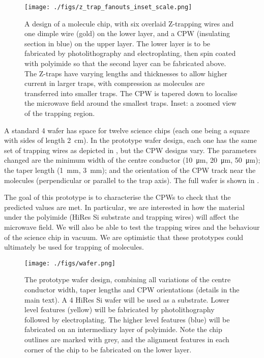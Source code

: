\begin{figure}[tph]
  \texttt{[image: ./figs/z\_trap\_fanouts\_inset\_scale.png]}
  \caption{
    A design of a molecule chip, with six overlaid Z-trapping wires and one
    dimple wire (gold) on the lower layer, and a CPW (insulating section in
    blue) on the upper layer.  The lower layer is to be fabricated by
    photolithography and electroplating, then spin coated with polyimide so that
    the second layer can be fabricated above. The Z-traps have varying lengths
    and thicknesses to allow higher current in larger traps, with compression as
    molecules are transferred into smaller traps. The CPW is tapered down to
    localise the microwave field around the smallest traps. Inset: a zoomed view
    of the trapping region.
  }
  \label{experiment:fig:chipdesign}
\end{figure}

A standard \SI{4}{\inch} wafer has space for twelve science chips (each one being
a square with sides of length \SI{2}{\centi\metre}). In the prototype wafer
design, each one has the same set of trapping wires as depicted in
, but the CPW designs vary. The parameters
changed are the minimum width of the centre conductor (\SI{10}{\micro\metre},
\SI{20}{\micro\metre}, \SI{50}{\micro\metre}); the taper length
(\SI{1}{\milli\metre}, \SI{3}{\milli\metre}); and the orientation of the CPW
track near the molecules (perpendicular or parallel to the trap axis). The full
wafer is shown in .

The goal of this prototype is to characterise the CPWs to check that the
predicted values are met. In particular, we are interested in how the material
under the polyimide (HiRes Si substrate and trapping wires) will affect the
microwave field. We will also be able to test the trapping wires and the
behaviour of the science chip in vacuum. We are optimistic that these prototypes could
ultimately be used for trapping of molecules.

\begin{figure}[tph]
  \texttt{[image: ./figs/wafer.png]}
  \caption{
    The prototype wafer design, combining all variations of the centre conductor
    width, taper lengths and CPW orientations (details in the main text). A
    \SI{4}{\inch} HiRes Si wafer will be used as a substrate. Lower level
    features (yellow) will be fabricated by photolithography followed by
    electroplating. The higher level features (blue) will be fabricated on an
    intermediary layer of polyimide. Note the chip outlines are marked with
    grey, and the alignment features in each corner of the chip to be fabricated
    on the lower layer.
  }
  \label{experiment:fig:chipdesign}
\end{figure}


